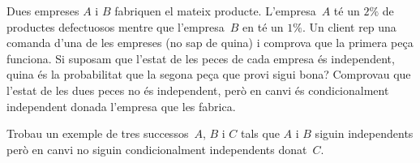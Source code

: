 \begin{prob}
{
Dues empreses $A$ i $B$ fabriquen el mateix producte. L'empresa~$A$ t\'e
un $2\%$ de productes defectuosos mentre que l'empresa~$B$ en t\'e un
$1\%$. Un client rep una comanda d'una de les empreses (no sap de
quina) i comprova que la primera pe\c{c}a funciona. Si suposam que
l'estat de les peces de cada empresa \'es independent, quina \'es la
probabilitat que la segona pe\c{c}a que provi sigui bona? Comprovau
que l'estat de les dues peces no \'es independent, per\`o en canvi \'es
condicionalment independent donada l'empresa que les fabrica.
}
\end{prob}

\begin{prob}
{
Trobau un exemple de tres successos~$A$, $B$ i $C$ tals que $A$ i $B$
siguin independents per\`o en canvi no siguin condicionalment
independents donat~$C$.
}
\end{prob}

